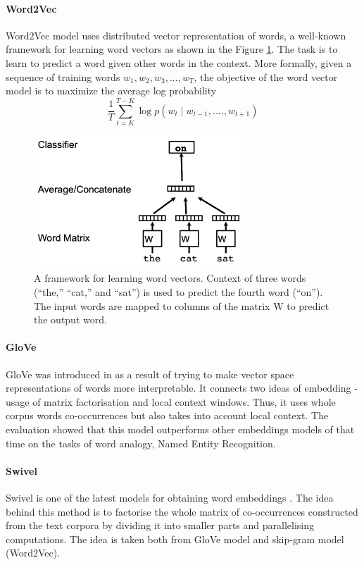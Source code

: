 \paragraph{Word2Vec} Word2Vec model uses distributed vector representation of words, a well-known framework for learning word vectors as shown in the Figure \ref{fig:Word2Vec model}. The task is to learn to predict a word given other words in the context.
More formally, given a sequence of training words
$w_{1}, w_{2}, w_{3}, ..., w_{T} $, the objective of the word vector model is to maximize the average log probability
\\
\begin{equation}
\frac{1}{T} \sum_{t=K}^{T-K} \log p(w_{t} \mid w_{t-1},....,w_{t+1}) 
\end{equation}

	\begin{figure}[h]
		\centering
		\includegraphics[width=8cm, height=5cm]{w2v.png}
		\caption{A framework for learning word vectors. Context of
			three words (“the,” “cat,” and “sat”) is used to predict the fourth
			word (“on”). The input words are mapped to columns of the matrix
			W to predict the output word.}
		\label{fig:Word2Vec model}
	\end{figure}
\paragraph{GloVe} GloVe was introduced in \cite{pennington2014glove} as a result of trying 
to make vector space representations of words more interpretable. It connects two ideas of 
embedding - usage of matrix factorisation and local context windows. Thus, it uses whole 
corpus words co-occurrences but also takes into account local context. The evaluation showed that 
this model outperforms other embeddings models of that time on the tasks of word analogy, 
Named Entity Recognition.

\paragraph{Swivel} Swivel is one of the latest models for obtaining word embeddings 
\cite{DBLP:journals/corr/ShazeerDEW16}. The idea behind this method is to factorise the whole 
matrix of co-occurrences constructed from the text corpora by dividing it into smaller parts and 
parallelising computations. The idea is taken both from GloVe model and skip-gram model 
(Word2Vec).

